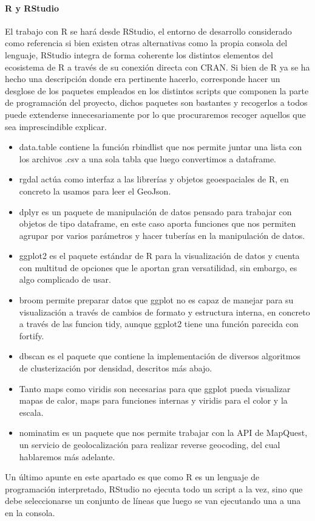 \documentclass[11pt, a4paper]{article} %
\begin{document}
\paragraph{R y RStudio}
El trabajo con R se hará desde RStudio, el entorno de desarrollo considerado como referencia si bien existen otras alternativas como la propia consola del lenguaje, RStudio integra de forma coherente los distintos elementos del ecosistema de R a través de su conexión directa con CRAN. Si bien de R ya se ha hecho una descripción donde era pertinente hacerlo, corresponde hacer un desglose de los paquetes empleados en los distintos scripts que componen la parte de programación del proyecto, dichos paquetes son bastantes y recogerlos a todos puede extenderse innecesariamente por lo que procuraremos recoger aquellos que sea imprescindible explicar.
\begin{itemize}
\item data.table contiene la función rbindlist que nos permite juntar una lista con los archivos .csv a una sola tabla que luego convertimos a dataframe.
\item rgdal actúa como interfaz a las librerías y objetos geoespaciales de R, en concreto la usamos para leer el GeoJson.
\item dplyr es un paquete de manipulación de datos pensado para trabajar con objetos de tipo dataframe, en este caso aporta funciones que nos permiten agrupar por varios parámetros y hacer tuberías en la manipulación de datos.
\item ggplot2 es el paquete estándar de R para la visualización de datos y cuenta con multitud de opciones que le aportan gran versatilidad, sin embargo, es algo complicado de usar.
\item broom permite preparar datos que ggplot no es capaz de manejar para su visualización a través de cambios de formato y estructura interna, en concreto  a través de las funcion tidy, aunque ggplot2 tiene una función parecida con fortify.
\item dbscan es el paquete que contiene la implementación de diversos algoritmos de clusterización por densidad, descritos más abajo.
\item Tanto maps como viridis son necesarias para que ggplot pueda visualizar mapas de calor, maps para funciones internas y viridis para el color y la escala.
\item nominatim es un paquete que nos permite trabajar con la API de MapQuest, un servicio de geolocalización para realizar reverse geocoding, del cual hablaremos más adelante.
\end{itemize}
Un último apunte en este apartado es que como R es un lenguaje de programación interpretado, RStudio no ejecuta todo un script a la vez, sino que debe seleccionarse un conjunto de líneas que luego se van ejecutando una a una en la consola.
\end{document}

